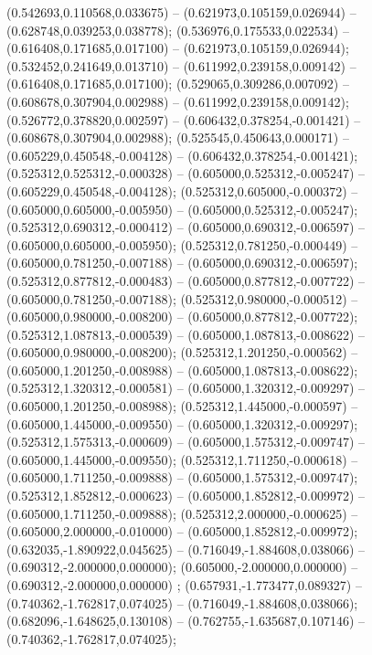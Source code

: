  (0.542693,0.110568,0.033675) -- (0.621973,0.105159,0.026944) -- (0.628748,0.039253,0.038778);
 (0.536976,0.175533,0.022534) -- (0.616408,0.171685,0.017100) -- (0.621973,0.105159,0.026944);
 (0.532452,0.241649,0.013710) -- (0.611992,0.239158,0.009142) -- (0.616408,0.171685,0.017100);
 (0.529065,0.309286,0.007092) -- (0.608678,0.307904,0.002988) -- (0.611992,0.239158,0.009142);
 (0.526772,0.378820,0.002597) -- (0.606432,0.378254,-0.001421) -- (0.608678,0.307904,0.002988);
 (0.525545,0.450643,0.000171) -- (0.605229,0.450548,-0.004128) -- (0.606432,0.378254,-0.001421);
 (0.525312,0.525312,-0.000328) -- (0.605000,0.525312,-0.005247) -- (0.605229,0.450548,-0.004128);
 (0.525312,0.605000,-0.000372) -- (0.605000,0.605000,-0.005950) -- (0.605000,0.525312,-0.005247);
 (0.525312,0.690312,-0.000412) -- (0.605000,0.690312,-0.006597) -- (0.605000,0.605000,-0.005950);
 (0.525312,0.781250,-0.000449) -- (0.605000,0.781250,-0.007188) -- (0.605000,0.690312,-0.006597);
 (0.525312,0.877812,-0.000483) -- (0.605000,0.877812,-0.007722) -- (0.605000,0.781250,-0.007188);
 (0.525312,0.980000,-0.000512) -- (0.605000,0.980000,-0.008200) -- (0.605000,0.877812,-0.007722);
 (0.525312,1.087813,-0.000539) -- (0.605000,1.087813,-0.008622) -- (0.605000,0.980000,-0.008200);
 (0.525312,1.201250,-0.000562) -- (0.605000,1.201250,-0.008988) -- (0.605000,1.087813,-0.008622);
 (0.525312,1.320312,-0.000581) -- (0.605000,1.320312,-0.009297) -- (0.605000,1.201250,-0.008988);
 (0.525312,1.445000,-0.000597) -- (0.605000,1.445000,-0.009550) -- (0.605000,1.320312,-0.009297);
 (0.525312,1.575313,-0.000609) -- (0.605000,1.575312,-0.009747) -- (0.605000,1.445000,-0.009550);
 (0.525312,1.711250,-0.000618) -- (0.605000,1.711250,-0.009888) -- (0.605000,1.575312,-0.009747);
 (0.525312,1.852812,-0.000623) -- (0.605000,1.852812,-0.009972) -- (0.605000,1.711250,-0.009888);
 (0.525312,2.000000,-0.000625) -- (0.605000,2.000000,-0.010000) -- (0.605000,1.852812,-0.009972);
 (0.632035,-1.890922,0.045625) -- (0.716049,-1.884608,0.038066) -- (0.690312,-2.000000,0.000000);
 (0.605000,-2.000000,0.000000) -- (0.690312,-2.000000,0.000000) ;
 (0.657931,-1.773477,0.089327) -- (0.740362,-1.762817,0.074025) -- (0.716049,-1.884608,0.038066);
 (0.682096,-1.648625,0.130108) -- (0.762755,-1.635687,0.107146) -- (0.740362,-1.762817,0.074025);
